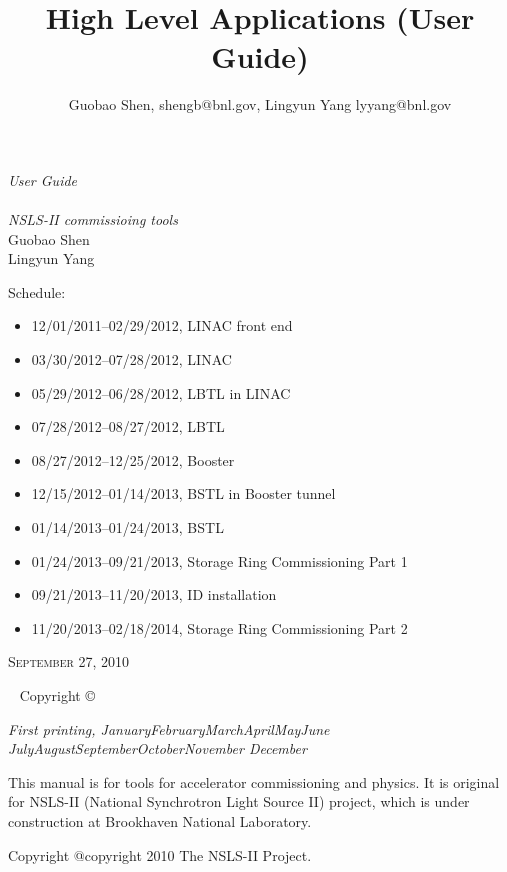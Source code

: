 \documentclass[11pt,oneside,letterpaper,showtrims,article]{memoir}
\title{High Level Applications (User Guide)}
\author{Guobao Shen, shengb@bnl.gov, Lingyun Yang lyyang@bnl.gov}
\newcommand{\monthyear}{%
  \ifcase\month\or January\or February\or March\or April\or May\or June\or
  July\or August\or September\or October\or November\or
  December\fi\space\number\year
}
\begin{document}
\begin{titlingpage}
{\begingroup%
\raggedleft
\vspace*{\baselineskip}
{\Huge\itshape User Guide} \\
\vspace*{\baselineskip}{\Huge\itshape of High Level Applications}\\[\baselineskip]
{\large\itshape NSLS-II commissioing tools}\\[0.2\textheight]
{\Large Guobao Shen\\Lingyun Yang}\par
\vfill
\flushleft
{\sffamily
  Schedule:\hfill
\begin{itemize}
\item 12/01/2011--02/29/2012, LINAC front end
\item 03/30/2012--07/28/2012, LINAC
\item 05/29/2012--06/28/2012, LBTL in LINAC
\item 07/28/2012--08/27/2012, LBTL
\item 08/27/2012--12/25/2012, Booster
\item 12/15/2012--01/14/2013, BSTL in Booster tunnel
\item 01/14/2013--01/24/2013, BSTL
\item 01/24/2013--09/21/2013, Storage Ring Commissioning Part 1
\item 09/21/2013--11/20/2013, ID installation
\item 11/20/2013--02/18/2014, Storage Ring Commissioning Part 2
\end{itemize}
}
\vspace*{5ex}
{\small\scshape September 27, 2010}
\vspace*{\baselineskip}
\endgroup}
\end{titlingpage}


\newpage
~\vfill
\thispagestyle{empty}
\setlength{\parindent}{0pt}
\setlength{\parskip}{\baselineskip}
Copyright \copyright\ %

\par\textit{First printing, \monthyear}

This manual is for tools for accelerator commissioning and physics. It
is original for NSLS-II (National Synchrotron Light Source II)
project, which is under construction at Brookhaven National
Laboratory. 

Copyright @copyright{} 2010 The NSLS-II Project.


\newpage
\thispagestyle{empty}
\setcounter{tocdepth}{3}
\tableofcontents*
\end{document}
